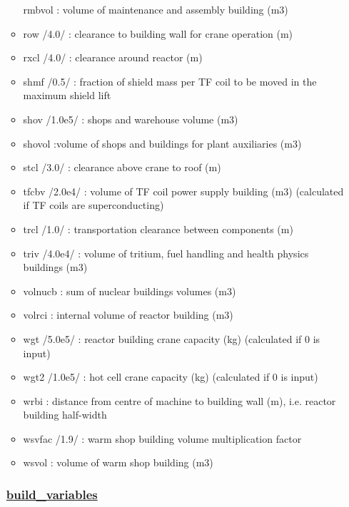 \documentclass[]{article}
\begin{document}
\begin{itemize}
\begin{itemize}
    rmbvol : volume of maintenance and assembly building (m3)
  \item
    row /4.0/ : clearance to building wall for crane operation (m)
  \item
    rxcl /4.0/ : clearance around reactor (m)
  \item
    shmf /0.5/ : fraction of shield mass per TF coil to be moved in the
    maximum shield lift
  \item
    shov /1.0e5/ : shops and warehouse volume (m3)
  \item
    shovol :volume of shops and buildings for plant auxiliaries (m3)
  \item
    stcl /3.0/ : clearance above crane to roof (m)
  \item
    tfcbv /2.0e4/ : volume of TF coil power supply building (m3)
    (calculated if TF coils are superconducting)
  \item
    trcl /1.0/ : transportation clearance between components (m)
  \item
    triv /4.0e4/ : volume of tritium, fuel handling and health physics
    buildings (m3)
  \item
    volnucb : sum of nuclear buildings volumes (m3)
  \item
    volrci : internal volume of reactor building (m3)
  \item
    wgt /5.0e5/ : reactor building crane capacity (kg) (calculated if 0
    is input)
  \item
    wgt2 /1.0e5/ : hot cell crane capacity (kg) (calculated if 0 is
    input)
  \item
    wrbi : distance from centre of machine to building wall (m), i.e.
    reactor building half-width
  \item
    wsvfac /1.9/ : warm shop building volume multiplication factor
  \item
    wsvol : volume of warm shop building (m3)
  \end{itemize}

  \subsubsection{\texorpdfstring{\href{build_variables.html}{build\_variables}}{build\_variables}}\label{build_variables}


\end{itemize}
\end{document}
